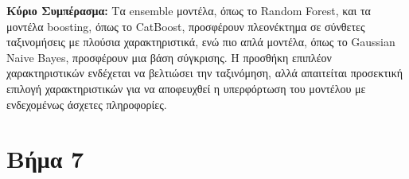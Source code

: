 \documentclass[a4paper,12pt]{article}
\begin{document}
\textbf{Κύριο Συμπέρασμα:} Τα ensemble μοντέλα, όπως το Random Forest, και τα μοντέλα boosting, όπως το CatBoost, προσφέρουν πλεονέκτημα σε σύνθετες ταξινομήσεις με πλούσια χαρακτηριστικά, ενώ πιο απλά μοντέλα, όπως το Gaussian Naive Bayes, προσφέρουν μια βάση σύγκρισης. Η προσθήκη επιπλέον χαρακτηριστικών ενδέχεται να βελτιώσει την ταξινόμηση, αλλά απαιτείται προσεκτική επιλογή χαρακτηριστικών για να αποφευχθεί η υπερφόρτωση του μοντέλου με ενδεχομένως άσχετες πληροφορίες.


\section*{Βήμα 7}
\end{document}
